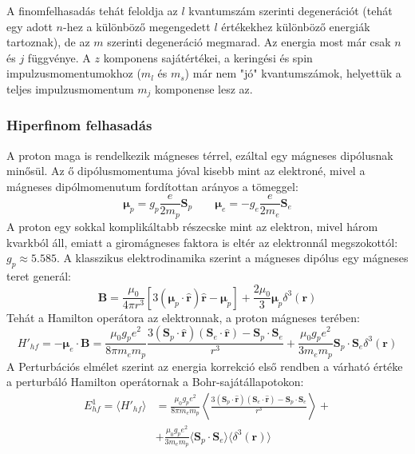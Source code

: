 \documentclass[../main.tex]{subfiles}
\begin{document}
A finomfelhasadás tehát feloldja az $l$ kvantumszám szerinti degenerációt (tehát egy adott $n$-hez a különböző megengedett $l$ értékekhez különböző energiák tartoznak), de az $m$ szerinti degeneráció megmarad. Az energia most már csak $n$ és $j$ függvénye.
A $z$ komponens sajátértékei, a keringési és spin impulzusmomentumokhoz ($m_l$ és $m_s$) már nem "jó" kvantumszámok, helyettük a teljes impulzusmomentum $m_j$ komponense lesz az.

\subsubsection{Hiperfinom felhasadás}
A proton maga is rendelkezik mágneses térrel, ezáltal egy mágneses dipólusnak minősül. Az ő dipólusmomentuma jóval kisebb mint az elektroné, mivel a mágneses dipólmomenutum fordítottan arányos a tömeggel:
\begin{equation}
    \boldsymbol{\mu}_p = g_p \frac{e}{2 m_p} \mathbf{S}_p \qquad \boldsymbol{\mu}_e = - g_e \frac{e}{2 m_e} \mathbf{S}_e
\end{equation}
A proton egy sokkal komplikáltabb részecske mint az elektron, mivel három kvarkból áll, emiatt a giromágneses faktora is eltér az elektronnál megszokottól: $g_p \approx 5.585$.
A klasszikus elektrodinamika szerint a mágneses dipólus egy mágneses teret generál:
\begin{equation}
    \mathbf{B} = \frac{\mu_0}{4 \pi r^3} \left[ 3 (\boldsymbol{\mu}_p \cdot \hat{\mathbf{r}}) \hat{\mathbf{r}} - \boldsymbol{\mu}_p \right] + \frac{2 \mu_0}{3} \boldsymbol{\mu}_p \delta^3(\mathbf{r})
\end{equation}
Tehát a Hamilton operátora az elektronnak, a proton mágneses terében:
\begin{equation}
    H'_{hf} = - \boldsymbol{\mu}_e \cdot \mathbf{B} = \frac{\mu_0 g_p e^2}{8 \pi m_e m_p} \frac{3 (\mathbf{S}_p \cdot \hat{\mathbf{r}})(\mathbf{S}_e \cdot \hat{\mathbf{r}}) - \mathbf{S}_p \cdot \mathbf{S}_e}{r^3} + \frac{\mu_0 g_p e^2}{3 m_e m_p} \mathbf{S}_p \cdot \mathbf{S}_e \delta^3(\mathbf{r})
\end{equation}
A Perturbációs elmélet szerint az energia korrekció első rendben a várható értéke a perturbáló Hamilton operátornak a Bohr-sajátállapotokon:
\begin{equation}
    \begin{aligned}
        E^1_{hf} = \langle H'_{hf} \rangle &= \frac{\mu_0 g_p e^2}{8 \pi m_e m_p} \left\langle \frac{3 (\mathbf{S}_p \cdot \hat{\mathbf{r}})(\mathbf{S}_e \cdot \hat{\mathbf{r}}) - \mathbf{S}_p \cdot \mathbf{S}_e}{r^3} \right\rangle + \\
        &+ \frac{\mu_0 g_p e^2}{3 m_e m_p} \langle \mathbf{S}_p \cdot \mathbf{S}_e \rangle \langle \delta^3(\mathbf{r}) \rangle
    \end{aligned}
\end{equation}
\end{document}
